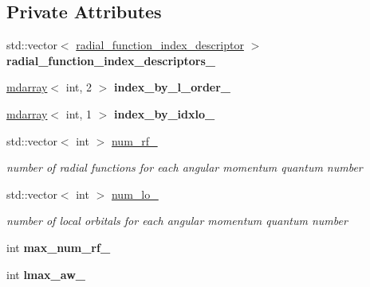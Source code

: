 \subsection*{Private Attributes}
\begin{DoxyCompactItemize}
\item 
\hypertarget{classsirius_1_1radial__functions__index_a3ff7d197be914bb11cf9b9b4f6f69b6b}{}std\+::vector$<$ \hyperlink{structradial__function__index__descriptor}{radial\+\_\+function\+\_\+index\+\_\+descriptor} $>$ {\bfseries radial\+\_\+function\+\_\+index\+\_\+descriptors\+\_\+}\label{classsirius_1_1radial__functions__index_a3ff7d197be914bb11cf9b9b4f6f69b6b}

\item 
\hypertarget{classsirius_1_1radial__functions__index_aa773367e5299769ff52878a5771f1559}{}\hyperlink{classsddk_1_1mdarray}{mdarray}$<$ int, 2 $>$ {\bfseries index\+\_\+by\+\_\+l\+\_\+order\+\_\+}\label{classsirius_1_1radial__functions__index_aa773367e5299769ff52878a5771f1559}

\item 
\hypertarget{classsirius_1_1radial__functions__index_a6fbd77a2600bdba026e86dd7933dc562}{}\hyperlink{classsddk_1_1mdarray}{mdarray}$<$ int, 1 $>$ {\bfseries index\+\_\+by\+\_\+idxlo\+\_\+}\label{classsirius_1_1radial__functions__index_a6fbd77a2600bdba026e86dd7933dc562}

\item 
std\+::vector$<$ int $>$ \hyperlink{classsirius_1_1radial__functions__index_a0859adef221bb10651fe2140690cc979}{num\+\_\+rf\+\_\+}
\begin{DoxyCompactList}\small\item\em number of radial functions for each angular momentum quantum number \end{DoxyCompactList}\item 
std\+::vector$<$ int $>$ \hyperlink{classsirius_1_1radial__functions__index_a4e8aeb4eb19625b352bd6b05a0a5e93d}{num\+\_\+lo\+\_\+}
\begin{DoxyCompactList}\small\item\em number of local orbitals for each angular momentum quantum number \end{DoxyCompactList}\item 
\hypertarget{classsirius_1_1radial__functions__index_ab0b64199225001b2398ae8962d0c7b13}{}int {\bfseries max\+\_\+num\+\_\+rf\+\_\+}\label{classsirius_1_1radial__functions__index_ab0b64199225001b2398ae8962d0c7b13}

\item 
\hypertarget{classsirius_1_1radial__functions__index_a6bcd07aef983bf80413a02531bc8af1e}{}int {\bfseries lmax\+\_\+aw\+\_\+}\label{classsirius_1_1radial__functions__index_a6bcd07aef983bf80413a02531bc8af1e}


\end{DoxyCompactItemize}
